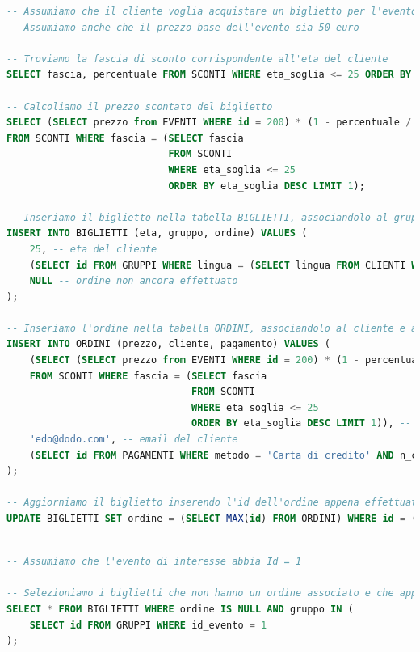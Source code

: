 \documentclass[a4paper,12pt]{report}
\begin{document}
\begin{lstlisting}[style=codeStyle,language=SQL,caption={operazione \textbf{Acquisto biglietto per un determinato evento e
	valutazione sconto} \ref{op:acquisto_biglietto}}]
-- Assumiamo che il cliente voglia acquistare un biglietto per l'evento con Id = 1 e che abbia 25 anni
-- Assumiamo anche che il prezzo base dell'evento sia 50 euro

-- Troviamo la fascia di sconto corrispondente all'eta del cliente
SELECT fascia, percentuale FROM SCONTI WHERE eta_soglia <= 25 ORDER BY eta_soglia DESC LIMIT 1;

-- Calcoliamo il prezzo scontato del biglietto
SELECT (SELECT prezzo from EVENTI WHERE id = 200) * (1 - percentuale / 100) AS prezzo_scontato 
FROM SCONTI WHERE fascia = (SELECT fascia 
                            FROM SCONTI 
                            WHERE eta_soglia <= 25 
                            ORDER BY eta_soglia DESC LIMIT 1);

-- Inseriamo il biglietto nella tabella BIGLIETTI, associandolo al gruppo con la lingua preferita dal cliente
INSERT INTO BIGLIETTI (eta, gruppo, ordine) VALUES (
	25, -- eta del cliente
	(SELECT id FROM GRUPPI WHERE lingua = (SELECT lingua FROM CLIENTI WHERE email = 'cliente@email.com') AND id_evento = 1 LIMIT 1), -- id del gruppo con la lingua preferita
	NULL -- ordine non ancora effettuato
);

-- Inseriamo l'ordine nella tabella ORDINI, associandolo al cliente e al pagamento
INSERT INTO ORDINI (prezzo, cliente, pagamento) VALUES (
	(SELECT (SELECT prezzo from EVENTI WHERE id = 200) * (1 - percentuale / 100) AS prezzo_scontato 
	FROM SCONTI WHERE fascia = (SELECT fascia 
								FROM SCONTI 
								WHERE eta_soglia <= 25 
								ORDER BY eta_soglia DESC LIMIT 1)), -- prezzo scontato del biglietto
	'edo@dodo.com', -- email del cliente
	(SELECT id FROM PAGAMENTI WHERE metodo = 'Carta di credito' AND n_carta = 1234567890123456) -- id del pagamento con carta di credito
);

-- Aggiorniamo il biglietto inserendo l'id dell'ordine appena effettuato
UPDATE BIGLIETTI SET ordine = (SELECT MAX(id) FROM ORDINI) WHERE id = (SELECT MAX(id) );
	
\end{lstlisting}

\begin{lstlisting}[style=codeStyle,language=SQL,caption={operazione \textbf{Biglietti Invenduti} \ref{op:biglietti_invenduti}}]
-- Assumiamo che l'evento di interesse abbia Id = 1

-- Selezioniamo i biglietti che non hanno un ordine associato e che appartengono a un gruppo dell'evento con Id = 1
SELECT * FROM BIGLIETTI WHERE ordine IS NULL AND gruppo IN (
    SELECT id FROM GRUPPI WHERE id_evento = 1
);
\end{lstlisting}
\end{document}
